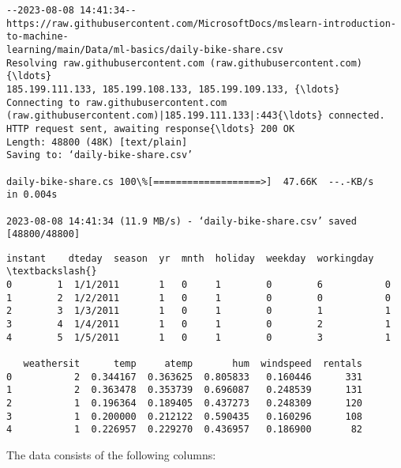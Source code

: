 \documentclass[11pt]{article}
\makeatletter
\newcommand{\boxspacing}{\kern\kvtcb@left@rule\kern\kvtcb@boxsep}
\newcommand{\prompt}[4]{
        {\ttfamily\llap{{\color{#2}[#3]:\hspace{3pt}#4}}\vspace{-\baselineskip}}
    }
\makeatother
\begin{document}
    \begin{Verbatim}[commandchars=\\\{\}]
--2023-08-08 14:41:34--
https://raw.githubusercontent.com/MicrosoftDocs/mslearn-introduction-to-machine-
learning/main/Data/ml-basics/daily-bike-share.csv
Resolving raw.githubusercontent.com (raw.githubusercontent.com){\ldots}
185.199.111.133, 185.199.108.133, 185.199.109.133, {\ldots}
Connecting to raw.githubusercontent.com
(raw.githubusercontent.com)|185.199.111.133|:443{\ldots} connected.
HTTP request sent, awaiting response{\ldots} 200 OK
Length: 48800 (48K) [text/plain]
Saving to: ‘daily-bike-share.csv’

daily-bike-share.cs 100\%[===================>]  47.66K  --.-KB/s    in 0.004s

2023-08-08 14:41:34 (11.9 MB/s) - ‘daily-bike-share.csv’ saved [48800/48800]

    \end{Verbatim}

            \begin{tcolorbox}[breakable, size=fbox, boxrule=.5pt, pad at break*=1mm, opacityfill=0]
\prompt{Out}{outcolor}{1}{\boxspacing}
\begin{Verbatim}[commandchars=\\\{\}]
   instant    dteday  season  yr  mnth  holiday  weekday  workingday  \textbackslash{}
0        1  1/1/2011       1   0     1        0        6           0
1        2  1/2/2011       1   0     1        0        0           0
2        3  1/3/2011       1   0     1        0        1           1
3        4  1/4/2011       1   0     1        0        2           1
4        5  1/5/2011       1   0     1        0        3           1

   weathersit      temp     atemp       hum  windspeed  rentals
0           2  0.344167  0.363625  0.805833   0.160446      331
1           2  0.363478  0.353739  0.696087   0.248539      131
2           1  0.196364  0.189405  0.437273   0.248309      120
3           1  0.200000  0.212122  0.590435   0.160296      108
4           1  0.226957  0.229270  0.436957   0.186900       82
\end{Verbatim}
\end{tcolorbox}
        
    The data consists of the following columns:
\end{document}
